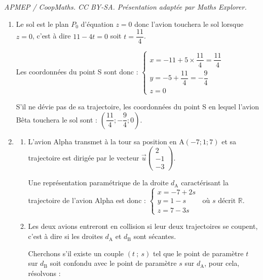 \documentclass[10pt]{article}
\providecommand{\R}{\mathbb{R}}
\providecommand{\vect}[1]{\overrightarrow{#1}}
\begin{document}
\noindent\textit{APMEP / CoopMaths. CC BY-SA. Présentation adaptée par Maths Explorer.}\par\medskip
\begin{enumerate}
\item Le sol est le plan $P_{0}$ d'équation $z=0$ donc l'avion touchera le sol lorsque $z=0$, c'est à dire $11-4t=0$ soit $t=\dfrac{11}{4}$.

Les coordonnées du point S sont donc : $\begin{cases} x = -11 + 5\times\dfrac{11}{4} = \dfrac{11}{4}  \\ y = -5 + \dfrac{11}{4} =-\dfrac{9}{4}\\ z = 0 \end{cases}$

S'il ne dévie pas de sa trajectoire,  les coordonnées du point S en lequel l'avion Bêta touchera le sol sont : $\left(\dfrac{11}{4};-\dfrac{9}{4};0\right)$.
\item
	\begin{enumerate}
		\item  L'avion Alpha transmet à la tour sa position en A$(-7; 1; 7)$ et sa trajectoire est dirigée par le vecteur $\vect{u}\begin{pmatrix}2\\-1\\-3\end{pmatrix}$.

Une représentation paramétrique de la droite $d_{\mathrm{A}}$ caractérisant la trajectoire de l'avion Alpha est donc :
$\begin{cases} x = -7 + 2s \\ y = 1 -s \\ z = 7 - 3s \end{cases}~\text{ où } s \text{ décrit } \R.$

		\item Les deux avions entreront  en collision si leur deux trajectoires se coupent, c'est à dire si les droites $d_{\mathrm{A}}$ et $d_{\mathrm{B}}$ sont sécantes.

Cherchons s'il existe un couple $(t~;~s)$ tel que le point de paramètre $t$ sur $d_{\mathrm{B}}$ soit confondu avec le point de paramètre $s$ sur $d_{\mathrm{A}}$, pour cela, résolvons :


\end{enumerate}
\end{enumerate}
\end{document}
